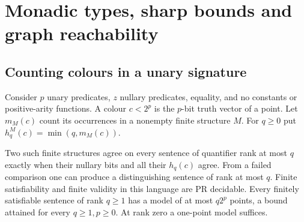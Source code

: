 \section{Monadic types, sharp bounds and graph reachability}\label{sec:expressive}
\subsection{Counting colours in a unary signature}
Consider $p$ unary predicates, $z$ nullary predicates, equality, and no constants or positive-arity functions. A colour $c<2^p$ is the $p$-bit truth vector of a point. Let $m_M(c)$ count its occurrences in a nonempty finite structure $M$. For $q\ge0$ put $h^M_q(c)=\min(q,m_M(c))$.

\begin{theorem}\label{thm:monadic}
Two such finite structures agree on every sentence of quantifier rank at most $q$ exactly when their nullary bits and all their $h_q(c)$ agree. From a failed comparison one can produce a distinguishing sentence of rank at most $q$. Finite satisfiability and finite validity in this language are PR decidable. Every finitely satisfiable sentence of rank $q\ge1$ has a model of at most $q2^p$ points, a bound attained for every $q\ge1,p\ge0$. At rank zero a one-point model suffices.
\end{theorem}

